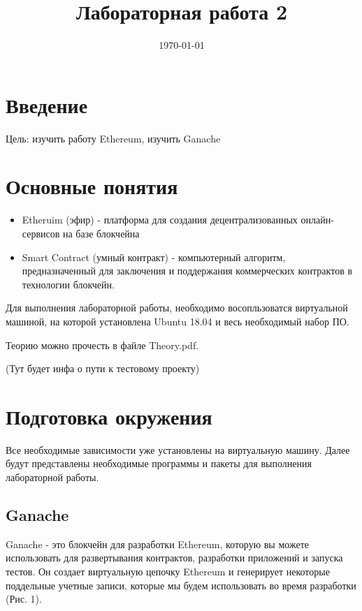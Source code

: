 \documentclass{article}
\begin{document}
\title{Лабораторная работа 2}

\date{\today}
\maketitle


\section{Введение}

Цель: изучить работу Ethereum, изучить Ganache


\section{Основные понятия}

\begin{itemize}
	\item Etheruim (эфир) -  платформа для создания децентрализованных онлайн-сервисов на базе блокчейна
	\item Smart Contract (умный контракт) - компьютерный алгоритм, предназначенный для заключения и поддержания коммерческих контрактов в технологии блокчейн. 	
\end{itemize}


Для выполнения лабораторной работы, необходимо восопльзоватся виртуальной машиной, на которой установлена Ubuntu 18.04 и весь необходимый набор ПО.

Теорию можно прочесть в файле Theory.pdf.

(Тут будет инфа о пути к тестовому проекту)


\section{Подготовка окружения}

Все необходимые зависимости уже установлены на виртуальную машину. Далее будут представлены необходимые программы и пакеты для выполнения лабораторной работы. 

\subsection{Ganache}

Ganache - это блокчейн для разработки Ethereum, которую вы можете использовать для развертывания контрактов, разработки приложений и запуска тестов. Он создает виртуальную цепочку Ethereum и генерирует некоторые поддельные учетные записи, которые мы будем использовать во время разработки (Рис. 1).
\end{document}
